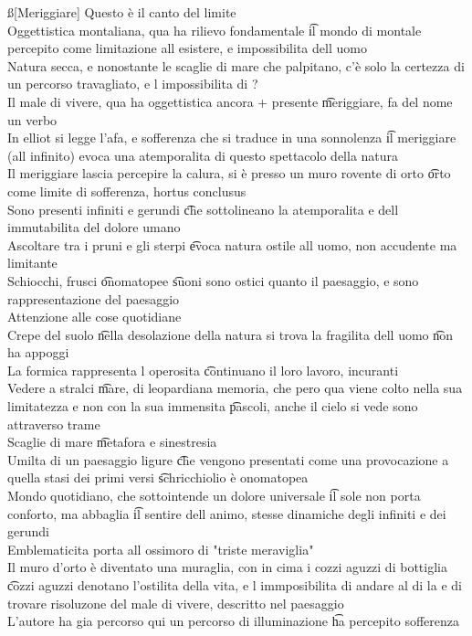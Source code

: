 \documentclass[12pt]{article}
\begin{document}
\ss[Meriggiare]
Questo è il canto del limite \\
Oggettistica montaliana, qua ha rilievo fondamentale \t il mondo di montale percepito come limitazione all esistere, e impossibilita dell uomo \\
Natura secca, e nonostante le scaglie di mare che palpitano, c'è solo la certezza di un percorso travagliato, e l impossibilita di ? \\
Il male di vivere, qua ha oggettistica ancora + presente \t meriggiare, fa del nome un verbo \\
In elliot si legge l'afa, e sofferenza che si traduce in una sonnolenza \t il meriggiare (all infinito) evoca una atemporalita di questo spettacolo della natura \\
Il meriggiare lascia percepire la calura, si è presso un muro rovente di orto \t orto come limite di sofferenza, hortus conclusus \\
Sono presenti infiniti e gerundi \t che sottolineano la atemporalita e dell immutabilita del dolore umano \\
Ascoltare tra i pruni e gli sterpi \t evoca natura ostile all uomo, non accudente ma limitante \\
Schiocchi, frusci \t onomatopee \t suoni sono ostici quanto il paesaggio, e sono rappresentazione del paesaggio \\
Attenzione alle cose quotidiane \\
Crepe del suolo \t nella desolazione della natura si trova la fragilita dell uomo \t non ha appoggi \\
La formica rappresenta l operosita \t continuano il loro lavoro, incuranti \\
Vedere a stralci \t mare, di leopardiana memoria, che pero qua viene colto nella sua limitatezza e non con la sua immensita \t pascoli, anche il cielo si vede sono attraverso trame \\
Scaglie di mare \t metafora e sinestresia \\
Umilta di un paesaggio ligure \t che vengono presentati come una provocazione a quella stasi dei primi versi \t schricchiolio è onomatopea \\
Mondo quotidiano, che sottointende un dolore universale \t il sole non porta conforto, ma abbaglia \t il sentire dell animo, stesse dinamiche degli infiniti e dei gerundi \\
Emblematicita porta all ossimoro di "triste meraviglia" \\
Il muro d'orto è diventato una muraglia, con in cima i cozzi aguzzi di bottiglia \t cozzi aguzzi denotano l'ostilita della vita, e l immposibilita di andare al di la e di trovare risoluzone del male di vivere, descritto nel paesaggio \\
L'autore ha gia percorso qui un percorso di illuminazione \t ha percepito sofferenza
\end{document}
